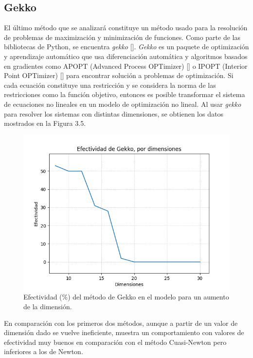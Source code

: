 \subsection{Gekko}

\par El \'ultimo m\'etodo que se analizar\'a constituye un m\'etodo usado para la resoluci\'on de problemas de maximizaci\'on y minimizaci\'on de funciones. Como parte de las bibliotecas de Python, se encuentra \textit{gekko} [\cite{13}]. \textit{Gekko} es un paquete de optimizaci\'on y aprendizaje autom\'atico que usa diferenciaci\'on autom\'atica y algoritmos basados en gradientes como APOPT (Advanced Process OPTimizer) [\cite{25}] o IPOPT (Interior Point OPTimizer) [\cite{26}] para encontrar soluci\'on a problemas de optimizaci\'on. Si cada ecuaci\'on constituye una restricci\'on y se considera la norma de las restricciones como la funci\'on objetivo, entonces es posible transformar el sistema de ecuaciones no lineales en un modelo de optimizaci\'on no lineal. Al usar \textit{gekko} para resolver los sistemas con distintas dimensiones, se obtienen los datos mostrados en la Figura 3.5.\\

\begin{figure}[h]
\center
\includegraphics[scale=.4]{Graphics/Gekko.png}
\caption{Efectividad (\%) del m\'etodo de Gekko en el modelo para un aumento de la dimensi\'on.}
\end{figure}

\par En comparaci\'on con los primeros dos m\'etodos, aunque a partir de un valor de dimensi\'on dado se vuelve ineficiente, muestra un comportamiento con valores de efectividad muy buenos en comparaci\'on con el m\'etodo Cuasi-Newton pero inferiores a los de Newton.

